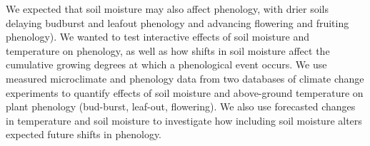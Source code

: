 \documentclass{article}
\begin{document}
\par We expected that soil moisture may also affect phenology, with drier soils delaying budburst and leafout phenology and advancing flowering and fruiting phenology). We wanted to test interactive effects of soil moisture and temperature on phenology, as well as how shifts in soil moisture affect the cumulative growing degrees at which a phenological event occurs. We use measured microclimate and phenology data from two databases of climate change experiments to quantify effects of soil moisture and above-ground temperature on plant phenology (bud-burst, leaf-out, flowering). We also use forecasted changes in temperature and soil moisture to investigate how including soil moisture alters expected future shifts in phenology. 
\end{document}
